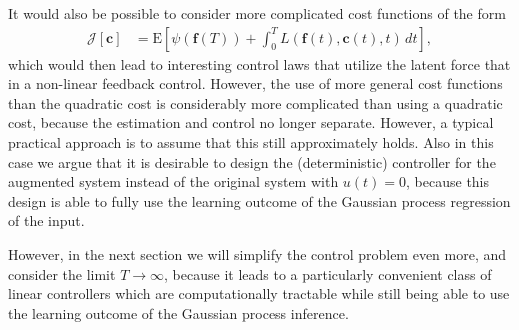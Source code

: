 \documentclass[journal]{IEEEtran}
\begin{document}
It would also be possible to consider more complicated cost functions of the form
%
\begin{equation}
\begin{split}
  \mathcal{J}[\mathbf{c}] &= \mathrm{E} \left[ \psi(\mathbf{f}(T))
   + \int_0^T L(\mathbf{f}(t),\mathbf{c}(t),t) \, dt \right],
\end{split}
\label{eq:quadcost1}
\end{equation}
%
which would then lead to interesting control laws that utilize the latent force that in a non-linear feedback control. However, the use of more general cost functions than the quadratic cost is considerably more complicated than using a quadratic cost, because the estimation and control no longer separate. However, a typical practical approach is to assume that this still approximately holds. Also in this case we argue that it is desirable to design the (deterministic) controller for the augmented system instead of the original system with $u(t) = 0$, because this design is able to fully use the learning outcome of the Gaussian process regression of the input.

However, in the next section we will simplify the control problem even more, and consider the limit $T \to \infty$, because it leads to a particularly convenient class of linear controllers which are computationally tractable while still being able to use the learning outcome of the Gaussian process inference.
\end{document}
